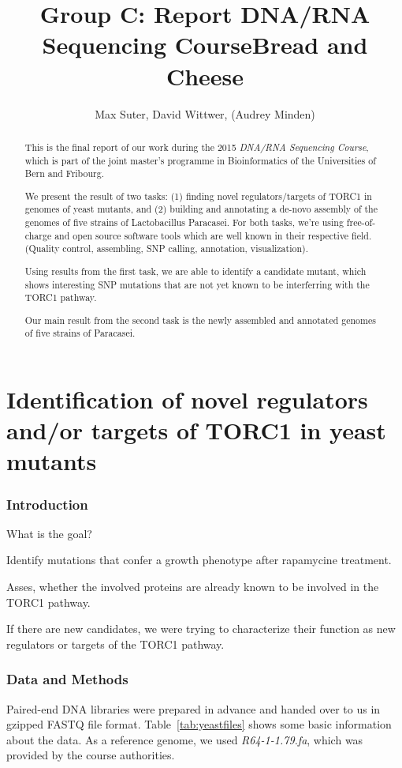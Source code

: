 \documentclass[10pt,a4paper]{article}
\title{Group C: Report DNA/RNA Sequencing Course\newline Bread and Cheese}
\author{Max Suter, David Wittwer, (Audrey Minden)}
\begin{document}
\maketitle

\begin{abstract}
This is the final report of our work during the 2015 \emph{DNA/RNA Sequencing Course}, which is part of the joint master's programme in Bioinformatics of the Universities of Bern and Fribourg.

We present the result of two tasks: (1) finding novel regulators/targets of TORC1 in genomes of yeast mutants, and  (2) building and annotating a de-novo assembly of the genomes of five strains of Lactobacillus Paracasei. For both tasks, we're using free-of-charge and open source software tools which are well known in their respective field. (Quality control, assembling, SNP calling, annotation, visualization).

Using results from the first task, we are able to identify a candidate mutant, which shows interesting SNP mutations that are not yet known to be interferring with the TORC1 pathway.


Our main result from the second task is the newly assembled and annotated genomes of five strains of Paracasei.


\end{abstract}


\pagebreak
\part{Identification of novel regulators and/or targets of TORC1 in yeast mutants}

\section{Introduction}
What is the goal?

Identify mutations that confer a growth phenotype after rapamycine treatment.

Asses, whether the involved proteins are already known to be involved in the TORC1 pathway.

If there are new candidates, we were trying to characterize their function as new regulators or targets of the TORC1 pathway.

\section{Data and Methods}
Paired-end DNA libraries were prepared in advance and handed over to us in gzipped FASTQ file format. Table~\ref{tab:yeastfiles} shows some basic information about the data. As a reference genome, we used \emph{R64-1-1.79.fa}, which was provided by the course authorities.
\end{document}
